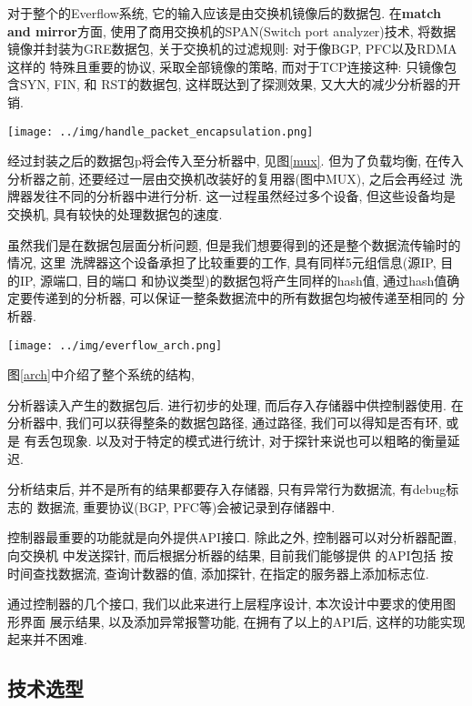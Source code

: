 {\begin{mdframed}[everyline=true]
对于整个的Everflow系统, 它的输入应该是由交换机镜像后的数据包.
在\textbf{match and mirror}方面,
使用了商用交换机的SPAN(Switch port analyzer)技术,
将数据镜像并封装为GRE数据包, 关于交换机的过滤规则: 对于像BGP,
PFC以及RDMA这样的 特殊且重要的协议, 采取全部镜像的策略,
而对于TCP连接这种: 只镜像包含SYN, FIN, 和 RST的数据包,
这样既达到了探测效果, 又大大的减少分析器的开销.

\begin{center}
    \texttt{[image: ../img/handle\_packet\_encapsulation.png]}
    \label{mux}
\end{center}

经过封装之后的数据包p将会传入至分析器中, 见图\ref{mux}. 但为了负载均衡,
在传入分析器之前, 还要经过一层由交换机改装好的复用器(图中MUX),
之后会再经过 洗牌器发往不同的分析器中进行分析. 这一过程虽然经过多个设备,
但这些设备均是交换机, 具有较快的处理数据包的速度.

虽然我们是在数据包层面分析问题,
但是我们想要得到的还是整个数据流传输时的情况, 这里
洗牌器这个设备承担了比较重要的工作, 具有同样5元组信息(源IP, 目的IP,
源端口, 目的端口 和协议类型)的数据包将产生同样的hash值,
通过hash值确定要传递到的分析器,
可以保证一整条数据流中的所有数据包均被传递至相同的 分析器.

\begin{center}
    \texttt{[image: ../img/everflow\_arch.png]}
    \label{arch}
\end{center}

图\ref{arch}中介绍了整个系统的结构,

分析器读入产生的数据包后. 进行初步的处理, 而后存入存储器中供控制器使用.
在分析器中, 我们可以获得整条的数据包路径, 通过路径,
我们可以得知是否有环, 或是 有丢包现象. 以及对于特定的模式进行统计,
对于探针来说也可以粗略的衡量延迟.

分析结束后, 并不是所有的结果都要存入存储器, 只有异常行为数据流,
有debug标志的 数据流, 重要协议(BGP, PFC等)会被记录到存储器中.

控制器最重要的功能就是向外提供API接口. 除此之外, 控制器可以对分析器配置,
向交换机 中发送探针, 而后根据分析器的结果, 目前我们能够提供 的API包括
按时间查找数据流, 查询计数器的值, 添加探针, 在指定的服务器上添加标志位.

通过控制器的几个接口, 我们以此来进行上层程序设计,
本次设计中要求的使用图形界面 展示结果, 以及添加异常报警功能,
在拥有了以上的API后, 这样的功能实现起来并不困难.

\subsection{技术选型}


\end{mdframed}}
